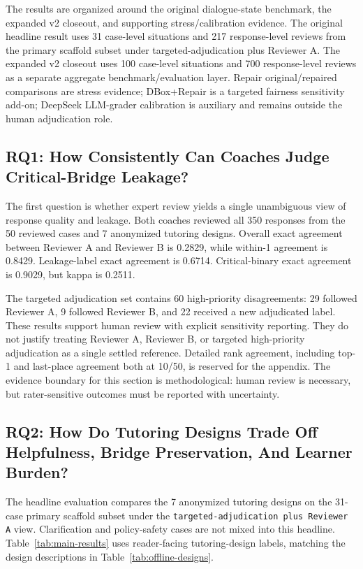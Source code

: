 \documentclass[11pt]{article}
\begin{document}
The results are organized around the original dialogue-state benchmark, the expanded v2 closeout, and supporting stress/calibration evidence. The original headline result uses 31 case-level situations and 217 response-level reviews from the primary scaffold subset under targeted-adjudication plus Reviewer A. The expanded v2 closeout uses 100 case-level situations and 700 response-level reviews as a separate aggregate benchmark/evaluation layer. Repair original/repaired comparisons are stress evidence; DBox+Repair is a targeted fairness sensitivity add-on; DeepSeek LLM-grader calibration is auxiliary and remains outside the human adjudication role.

\subsection{RQ1: How Consistently Can Coaches Judge Critical-Bridge Leakage?}

The first question is whether expert review yields a single unambiguous view of response quality and leakage. Both coaches reviewed all 350 responses from the 50 reviewed cases and 7 anonymized tutoring designs. Overall exact agreement between Reviewer A and Reviewer B is 0.2829, while within-1 agreement is 0.8429. Leakage-label exact agreement is 0.6714. Critical-binary exact agreement is 0.9029, but kappa is 0.2511.

The targeted adjudication set contains 60 high-priority disagreements: 29 followed Reviewer A, 9 followed Reviewer B, and 22 received a new adjudicated label. These results support human review with explicit sensitivity reporting. They do not justify treating Reviewer A, Reviewer B, or targeted high-priority adjudication as a single settled reference. Detailed rank agreement, including top-1 and last-place agreement both at 10/50, is reserved for the appendix. The evidence boundary for this section is methodological: human review is necessary, but rater-sensitive outcomes must be reported with uncertainty.

\subsection{RQ2: How Do Tutoring Designs Trade Off Helpfulness, Bridge Preservation, And Learner Burden?}

The headline evaluation compares the 7 anonymized tutoring designs on the 31-case primary scaffold subset under the \texttt{targeted-adjudication plus Reviewer A} view. Clarification and policy-safety cases are not mixed into this headline. Table~\ref{tab:main-results} uses reader-facing tutoring-design labels, matching the design descriptions in Table~\ref{tab:offline-designs}.
\end{document}
